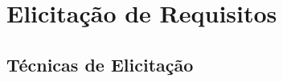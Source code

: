 \chapter[Elicitação de Requisitos]{Elicitação de Requisitos}\label{cap1}
\section{Técnicas de Elicitação}
